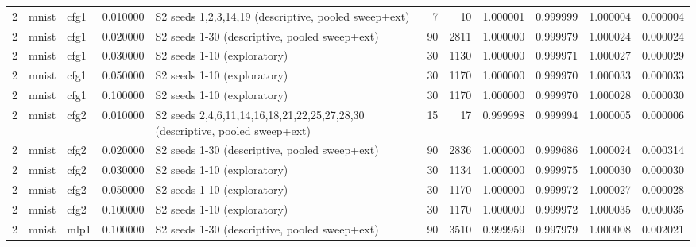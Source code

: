 \begin{table}[htbp]
{\begin{tabular}{@{}rllrlrrrrrr@{}}
2 & mnist & cfg1 & 0.010000 & S2 seeds 1,2,3,14,19 (descriptive, pooled sweep+ext) & 7 & 10 & 1.000001 & 0.999999 & 1.000004 & 0.000004 \\
2 & mnist & cfg1 & 0.020000 & S2 seeds 1-30 (descriptive, pooled sweep+ext) & 90 & 2811 & 1.000000 & 0.999979 & 1.000024 & 0.000024 \\
2 & mnist & cfg1 & 0.030000 & S2 seeds 1-10 (exploratory) & 30 & 1130 & 1.000000 & 0.999971 & 1.000027 & 0.000029 \\
2 & mnist & cfg1 & 0.050000 & S2 seeds 1-10 (exploratory) & 30 & 1170 & 1.000000 & 0.999970 & 1.000033 & 0.000033 \\
2 & mnist & cfg1 & 0.100000 & S2 seeds 1-10 (exploratory) & 30 & 1170 & 1.000000 & 0.999970 & 1.000028 & 0.000030 \\
2 & mnist & cfg2 & 0.010000 & S2 seeds 2,4,6,11,14,16,18,21,22,25,27,28,30 (descriptive, pooled sweep+ext) & 15 & 17 & 0.999998 & 0.999994 & 1.000005 & 0.000006 \\
2 & mnist & cfg2 & 0.020000 & S2 seeds 1-30 (descriptive, pooled sweep+ext) & 90 & 2836 & 1.000000 & 0.999686 & 1.000024 & 0.000314 \\
2 & mnist & cfg2 & 0.030000 & S2 seeds 1-10 (exploratory) & 30 & 1134 & 1.000000 & 0.999975 & 1.000030 & 0.000030 \\
2 & mnist & cfg2 & 0.050000 & S2 seeds 1-10 (exploratory) & 30 & 1170 & 1.000000 & 0.999972 & 1.000027 & 0.000028 \\
2 & mnist & cfg2 & 0.100000 & S2 seeds 1-10 (exploratory) & 30 & 1170 & 1.000000 & 0.999972 & 1.000035 & 0.000035 \\
2 & mnist & mlp1 & 0.100000 & S2 seeds 1-30 (descriptive, pooled sweep+ext) & 90 & 3510 & 0.999959 & 0.997979 & 1.000008 & 0.002021 \\
\bottomrule
\end{tabular}}
\end{table}
